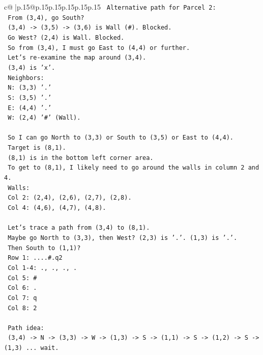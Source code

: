 \documentclass{article}
\begin{document}
{\begin{supertabular}{c@{$\;$}|p{.15\linewidth}@{}p{.15\linewidth}p{.15\linewidth}p{.15\linewidth}p{.15\linewidth}p{.15\linewidth}}
{{{\texttt{   Alternative path for Parcel 2:} \\
\texttt{   From (3,4), go South?} \\
\texttt{   (3,4) {-}> (3,5) {-}> (3,6) is Wall (\#). Blocked.} \\
\texttt{   Go West? (2,4) is Wall. Blocked.} \\
\texttt{   So from (3,4), I must go East to (4,4) or further.} \\
\texttt{   Let's re{-}examine the map around (3,4).} \\
\texttt{   (3,4) is 'x'.} \\
\texttt{   Neighbors:} \\
\texttt{   N: (3,3) '.'} \\
\texttt{   S: (3,5) '.'} \\
\texttt{   E: (4,4) '.'} \\
\texttt{   W: (2,4) '\#' (Wall).} \\
\\ 
\texttt{   So I can go North to (3,3) or South to (3,5) or East to (4,4).} \\
\texttt{   Target is (8,1).} \\
\texttt{   (8,1) is in the bottom left corner area.} \\
\texttt{   To get to (8,1), I likely need to go around the walls in column 2 and 4.} \\
\texttt{   Walls:} \\
\texttt{   Col 2: (2,4), (2,6), (2,7), (2,8).} \\
\texttt{   Col 4: (4,6), (4,7), (4,8).} \\
\\ 
\texttt{   Let's trace a path from (3,4) to (8,1).} \\
\texttt{   Maybe go North to (3,3), then West? (2,3) is '.'. (1,3) is '.'.} \\
\texttt{   Then South to (1,1)?} \\
\texttt{   Row 1: ....\#.q2} \\
\texttt{   Col 1{-}4: ., ., ., .} \\
\texttt{   Col 5: \#} \\
\texttt{   Col 6: .} \\
\texttt{   Col 7: q} \\
\texttt{   Col 8: 2} \\
\\ 
\texttt{   Path idea:} \\
\texttt{   (3,4) {-}> N {-}> (3,3) {-}> W {-}> (1,3) {-}> S {-}> (1,1) {-}> S {-}> (1,2) {-}> S {-}> (1,3) ... wait.} \\
}}}
\end{supertabular}}
\end{document}
